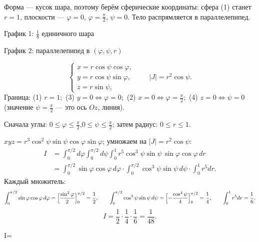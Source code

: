Форма --- кусок шара, поэтому берём сферические координаты: сфера (1) станет $r=1$, плоскости --- $\varphi=0$, $\varphi=\frac\pi2$, $\psi=0$. Тело распрямляется в параллелепипед.

\begin{center}
\begin{minipage}[t]{0.49\linewidth}\centering
\figSeven

\small График 1: $\frac18$ единичного шара
\end{minipage}\hfill
\begin{minipage}[t]{0.49\linewidth}\centering
{}

\small График 2: параллелепипед в $(\varphi,\psi,r)$
\end{minipage}
\end{center}

\[
\begin{cases}x=r\cos\psi\cos\varphi,\\ y=r\cos\psi\sin\varphi,\\ z=r\sin\psi,\end{cases}\qquad |J|=r^2\cos\psi .
\]
Граница: (1) $r=1$;\ (3) $y=0\iff\varphi=0$;\ (2) $x=0\iff\varphi=\frac\pi2$;\ (4) $z=0\iff\psi=0$ (значение $\psi=\frac\pi2$ --- это ось $Oz$, линия).

Сначала углы: $0\leqslant\varphi\leqslant\frac\pi2$,\quad $0\leqslant\psi\leqslant\frac\pi2$; затем радиус: $0\leqslant r\leqslant1$.

$xyz=r^3\cos^2\psi\sin\psi\cos\varphi\sin\varphi$; умножаем на $|J|=r^2\cos\psi$:
\[
\begin{aligned}I&=\int_0^{\pi/2}d\varphi\int_0^{\pi/2}d\psi\int_0^1 r^5\cos^3\psi\sin\psi\,\sin\varphi\cos\varphi\,dr\\
&=\int_0^{\pi/2}\sin\varphi\cos\varphi\,d\varphi\cdot\int_0^{\pi/2}\cos^3\psi\sin\psi\,d\psi\cdot\int_0^1r^5dr .\end{aligned}
\]
Каждый множитель:
\[
\int_0^{\pi/2}\sin\varphi\cos\varphi\,d\varphi=\Bigl[\frac{\sin^2\varphi}{2}\Bigr]_0^{\pi/2}=\frac12,\qquad
\int_0^{\pi/2}\cos^3\psi\sin\psi\,d\psi=\Bigl[-\frac{\cos^4\psi}{4}\Bigr]_0^{\pi/2}=\frac14,\qquad
\int_0^1r^5dr=\frac16.
\]
\[
I=\frac12\cdot\frac14\cdot\frac16=\frac1{48}.
\]

\begin{answerbox}
I=
\end{answerbox}

